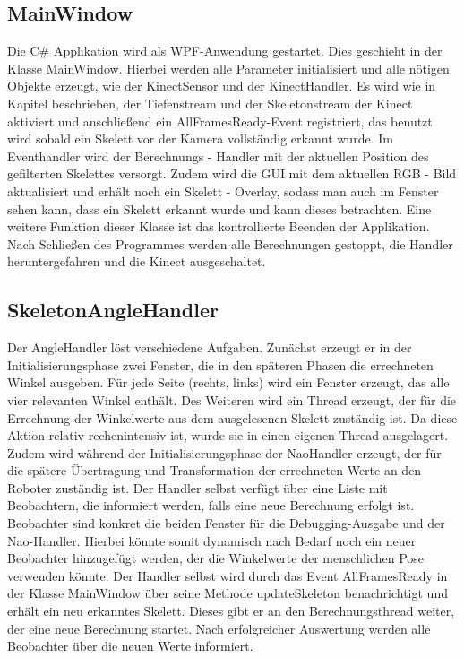 \subsection{MainWindow}
Die C\# Applikation wird als WPF-Anwendung gestartet. Dies geschieht in der Klasse \textsf{MainWindow}. Hierbei werden alle Parameter initialisiert und alle nötigen Objekte erzeugt, wie der KinectSensor und der KinectHandler. Es wird wie in Kapitel  beschrieben, der Tiefenstream und der Skeletonstream der Kinect aktiviert und anschließend ein AllFramesReady-Event registriert, das benutzt wird sobald ein Skelett vor der Kamera vollständig erkannt wurde. Im Eventhandler wird der Berechnungs - Handler mit der aktuellen Position des gefilterten Skelettes versorgt. Zudem wird die GUI mit dem aktuellen RGB - Bild aktualisiert und erhält noch ein Skelett - Overlay, sodass man auch im Fenster sehen kann, dass ein Skelett erkannt wurde und kann dieses betrachten. Eine weitere Funktion dieser Klasse ist das kontrollierte Beenden der Applikation. Nach Schließen des Programmes werden alle Berechnungen gestoppt, die Handler heruntergefahren und die Kinect ausgeschaltet.



\subsection{SkeletonAngleHandler}
Der \textsf{AngleHandler} löst verschiedene Aufgaben. Zunächst erzeugt er in der Initialisierungsphase zwei Fenster, die in den späteren Phasen die errechneten Winkel ausgeben. Für jede Seite (rechts, links) wird ein Fenster erzeugt, das alle vier relevanten Winkel enthält. Des Weiteren wird ein Thread erzeugt, der für die Errechnung der Winkelwerte aus dem ausgelesenen Skelett zuständig ist. Da diese Aktion relativ rechenintensiv ist, wurde sie in einen eigenen Thread ausgelagert. Zudem wird während der Initialisierungsphase der \textsf{NaoHandler} erzeugt, der für die spätere Übertragung und Transformation der errechneten Werte an den Roboter zuständig ist.
Der Handler selbst verfügt über eine Liste mit Beobachtern, die informiert werden, falls eine neue Berechnung erfolgt ist. Beobachter sind konkret die beiden Fenster für die Debugging-Ausgabe und der Nao-Handler. Hierbei könnte somit dynamisch nach Bedarf noch ein neuer Beobachter hinzugefügt werden, der die Winkelwerte der menschlichen Pose verwenden könnte.
Der Handler selbst wird durch das Event \textsf{AllFramesReady} in der Klasse MainWindow über seine Methode \textsf{updateSkeleton} benachrichtigt und erhält ein neu erkanntes Skelett. Dieses gibt er an den Berechnungsthread weiter, der eine neue Berechnung startet. Nach erfolgreicher Auswertung werden alle Beobachter über die neuen Werte informiert. 

